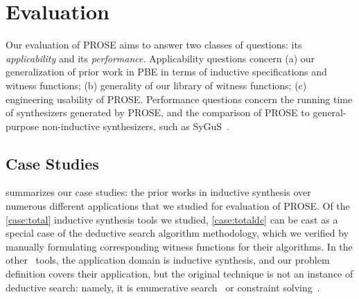 \section{Evaluation}
\label{sec:prose:evaluation}
Our evaluation of PROSE aims to answer two classes of questions: its \emph{applicability} and its \emph{performance}.
Applicability questions concern (a) our generalization of prior work in PBE
in terms of inductive specifications and witness functions; (b) generality of our library of witness functions;
(c) engineering usability of PROSE.
Performance questions concern the running time of synthesizers generated by PROSE, and the comparison of
PROSE to general-purpose non-inductive synthesizers, such as SyGuS~\cite{sygus}.

\subsection{Case Studies}
\label{sec:prose:evaluation:casestudies}
 summarizes our case studies: the prior works in inductive synthesis over numerous different
applications that we studied for evaluation of PROSE.
Of the \ref*{case:total} inductive synthesis tools we studied, \ref*{case:totaldc} can be cast as a special case of the
deductive search algorithm
methodology, which we verified by manually formulating corresponding witness functions for their algorithms.
In the other \pgfmathresult~tools, the
application domain is inductive synthesis, and our problem definition covers their application, but the original
technique is not an instance of deductive search: namely, it is enumerative
search~\cite{transit:protocols,magichaskeller} or constraint solving~\cite{quicksilver}.

